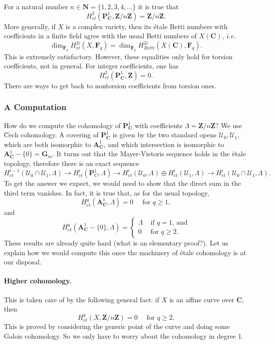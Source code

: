 For a natural number $n \in \mathbf{N} = \{1, 2, 3, 4, \dots\}$ it is true that
$$
H_{et}^2 (\mathbf{P}^1_\mathbf{C}, \mathbf{Z}/n\mathbf{Z}) = \mathbf{Z}/n\mathbf{Z}.
$$
More generally, if $X$ is a complex variety, then its \'etale Betti numbers with coefficients in a finite field agree with the usual Betti numbers of $X(\mathbf{C})$, {\it i.e.}
$$
\dim_{\mathbf{F}_q} H_{et}^{2i} (X, \mathbf{F}_q) = \dim_{\mathbf{F}_q} H_{Betti}^{2i} (X(\mathbf{C}), \mathbf{F}_q).
$$ 
This is extremely satisfactory. However, these equalities only hold for torsion coefficients, not in general. For integer coefficients, one has
$$
H_{et}^2 (\mathbf{P}^1_\mathbf{C}, \mathbf{Z}) = 0.
$$
There are ways to get back to nontorsion coefficients from torsion ones.

\subsubsection{A Computation}

How do we compute the cohomology of $\mathbf{P}^1_\mathbf{C}$ with coefficients $\Lambda = \mathbf{Z}/n\mathbf{Z}$? 
We use \u Cech cohomology. A covering of $\mathbf{P}^1_\mathbf{C}$ is given by the two standard opens $\mathcal{U}_0, \mathcal{U}_1$, which are both isomorphic to $\mathbf{A}^1_\mathbf{C}$, and  which intersection is isomorphic to $\mathbf{A}^1_\mathbf{C} -  \{0\} = \mathbf{G}_m$. It turns out that the Mayer-Vietoris sequence holds in the \'etale topology, therefore there is an exact sequence
$$
H_{et}^{i-1}(\mathcal{U}_0\cap \mathcal{U}_1, \Lambda) \to H_{et}^i(\mathbf{P}^1_C, \Lambda) \to H_{et}^i(\mathcal{U}_0, \Lambda) \oplus H_{et}^i(\mathcal{U}_1, \Lambda) \to H_{et}^i(\mathcal{U}_0\cap \mathcal{U}_1, \Lambda).
$$
To get the answer we expect, we would need to show that the direct sum in the third term vanishes. In fact, it is true that, as for the usual topology,
$$
H_{et}^q (\mathbf{A}^1_\mathbf{C}, \Lambda) = 0 \quad \text{ for } q \geq 1,
$$ 
and
$$
H_{et}^q (\mathbf{A}^1_\mathbf{C}-\{0\}, \Lambda) = \left\{
\begin{array}{ll}
\Lambda & \text{ if $q = 1$, and} \\
0 & \text{ for $q \geq 2$.}
\end{array}
\right. 
$$
These results are already quite hard (what is an elementary proof?). Let us explain how we would compute this once the machinery of \'etale cohomology is at our disposal.

\paragraph{Higher cohomology.} This is taken care of by the following general fact: if $X$ is an affine curve over $\mathbf{C}$, then 
$$
H_{et}^q (X, \mathbf{Z}/n\mathbf{Z}) = 0 \quad \text{ for } q \geq 2.
$$
This is proved by considering the generic point of the curve and doing some Galois cohomology. So we only have to worry about the cohomology in degree 1. 

